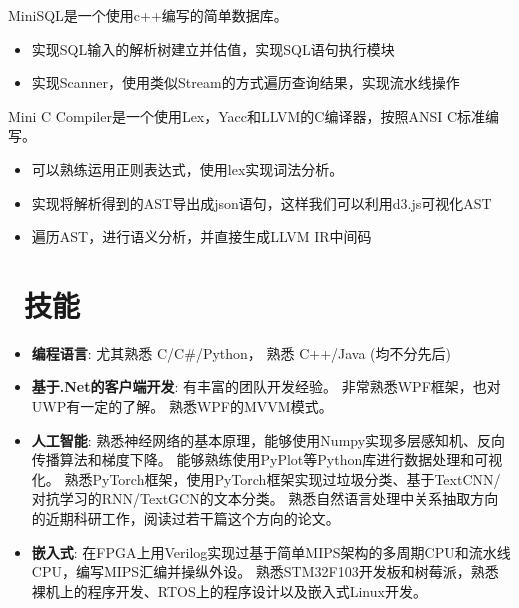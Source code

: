 \documentclass{resume}
\begin{document}
MiniSQL是一个使用c++编写的简单数据库。
\begin{itemize}
  \item 实现SQL输入的解析树建立并估值，实现SQL语句执行模块
  \item 实现Scanner，使用类似Stream的方式遍历查询结果，实现流水线操作
\end{itemize}

Mini C Compiler是一个使用Lex，Yacc和LLVM的C编译器，按照ANSI C标准编写。
\begin{itemize}
  \item 可以熟练运用正则表达式，使用lex实现词法分析。
  \item 实现将解析得到的AST导出成json语句，这样我们可以利用d3.js可视化AST
  \item 遍历AST，进行语义分析，并直接生成LLVM IR中间码
\end{itemize}



\section{\faCogs\ 技能}
\begin{itemize}[parsep=0.25ex]
    \item \textbf{编程语言}:
        尤其熟悉 C/C\#/Python，
        熟悉 C++/Java (均不分先后)

    \item \textbf{基于.Net的客户端开发}:
        有丰富的团队开发经验。
        非常熟悉WPF框架，也对UWP有一定的了解。
        熟悉WPF的MVVM模式。

    \item \textbf{人工智能}:
        熟悉神经网络的基本原理，能够使用Numpy实现多层感知机、反向传播算法和梯度下降。
        能够熟练使用PyPlot等Python库进行数据处理和可视化。
        熟悉PyTorch框架，使用PyTorch框架实现过垃圾分类、基于TextCNN/对抗学习的RNN/TextGCN的文本分类。
        熟悉自然语言处理中关系抽取方向的近期科研工作，阅读过若干篇这个方向的论文。

    \item \textbf{嵌入式}:
        在FPGA上用Verilog实现过基于简单MIPS架构的多周期CPU和流水线CPU，编写MIPS汇编并操纵外设。
        熟悉STM32F103开发板和树莓派，熟悉裸机上的程序开发、RTOS上的程序设计以及嵌入式Linux开发。
\end{itemize}
\end{document}
